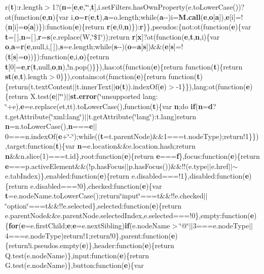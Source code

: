 {r}({\bf t})\-:r.\-length$>$1?({\bf n}=\mbox{[}{\bf e},{\bf e},\char`\"{}\char`\"{},{\bf t}\mbox{]},i.\-set\-Filters.\-has\-Own\-Property(e.\-to\-Lower\-Case())?ot(function({\bf e},{\bf n})\{var i,{\bf o}={\bf r}({\bf e},{\bf t}),{\bf a}=o.\-length;while({\bf a}-\/-\/)i={\bf M.\-call}({\bf e},{\bf o}\mbox{[}{\bf a}\mbox{]}),{\bf e}\mbox{[}i\mbox{]}=!({\bf n}\mbox{[}i\mbox{]}={\bf o}\mbox{[}{\bf a}\mbox{]})\})\-:function({\bf e})\{return {\bf r}({\bf e},0,{\bf n})\})\-:{\bf r}\}\},pseudos\-:\{not\-:ot(function({\bf e})\{var {\bf t}=\mbox{[}$\,$\mbox{]},{\bf n}=\mbox{[}$\,$\mbox{]},{\bf r}={\bf s}(e.\-replace(W,\char`\"{}\$1\char`\"{}));return {\bf r}\mbox{[}{\bf x}\mbox{]}?ot(function({\bf e},{\bf t},{\bf n},i)\{var {\bf o},{\bf a}={\bf r}({\bf e},null,i,\mbox{[}$\,$\mbox{]}),{\bf s}=e.\-length;while({\bf s}-\/-\/)({\bf o}={\bf a}\mbox{[}{\bf s}\mbox{]})\&\&({\bf e}\mbox{[}{\bf s}\mbox{]}=!({\bf t}\mbox{[}{\bf s}\mbox{]}={\bf o}))\})\-:function({\bf e},i,{\bf o})\{return {\bf t}\mbox{[}0\mbox{]}={\bf e},{\bf r}({\bf t},null,{\bf o},{\bf n}),!n.\-pop()\}\}),has\-:ot(function({\bf e})\{return function({\bf t})\{return {\bf st}({\bf e},{\bf t}).length$>$0\}\}),contains\-:ot(function({\bf e})\{return function({\bf t})\{return(t.\-text\-Content$\vert$$\vert$t.\-inner\-Text$\vert$$\vert${\bf o}({\bf t})).index\-Of({\bf e})$>$-\/1\}\}),lang\-:ot(function({\bf e})\{return X.\-test({\bf e}$\vert$$\vert$\char`\"{}\char`\"{})$\vert$$\vert${\bf st.\-error}(\char`\"{}unsupported lang\-: \char`\"{}+e),{\bf e}=e.\-replace(et,tt).to\-Lower\-Case(),function({\bf t})\{var {\bf n};do {\bf if}({\bf n}={\bf d}?t.\-get\-Attribute(\char`\"{}xml\-:lang\char`\"{})$\vert$$\vert$t.\-get\-Attribute(\char`\"{}lang\char`\"{})\-:t.\-lang)return {\bf n}=n.\-to\-Lower\-Case(),{\bf n}==={\bf e}$\vert$$\vert$0===n.\-index\-Of({\bf e}+\char`\"{}-\/\char`\"{});while(({\bf t}=t.\-parent\-Node)\&\&1===t.\-node\-Type);return!1\}\}),target\-:function({\bf t})\{var {\bf n}=e.\-location\&\&e.\-location.\-hash;return {\bf n}\&\&n.\-slice(1)===t.\-id\},root\-:function({\bf e})\{return {\bf e}==={\bf f}\},focus\-:function({\bf e})\{return {\bf e}===p.\-active\-Element\&\&(!p.\-has\-Focus$\vert$$\vert$p.\-has\-Focus())\&\&!!(e.\-type$\vert$$\vert$e.\-href$\vert$$\vert$$\sim$e.\-tab\-Index)\},enabled\-:function({\bf e})\{return e.\-disabled===!1\},disabled\-:function({\bf e})\{return e.\-disabled===!0\},checked\-:function({\bf e})\{var {\bf t}=e.\-node\-Name.\-to\-Lower\-Case();return\char`\"{}input\char`\"{}===t\&\&!!e.\-checked$\vert$$\vert$\char`\"{}option\char`\"{}===t\&\&!!e.\-selected\},selected\-:function({\bf e})\{return e.\-parent\-Node\&\&e.\-parent\-Node.\-selected\-Index,e.\-selected===!0\},empty\-:function({\bf e})\{{\bf for}({\bf e}=e.\-first\-Child;{\bf e};{\bf e}=e.\-next\-Sibling){\bf if}(e.\-node\-Name$>$\char`\"{}@\char`\"{}$\vert$$\vert$3===e.\-node\-Type$\vert$$\vert$4===e.\-node\-Type)return!1;return!0\},parent\-:function({\bf e})\{return!i.\-pseudos.\-empty({\bf e})\},header\-:function({\bf e})\{return Q.\-test(e.\-node\-Name)\},input\-:function({\bf e})\{return G.\-test(e.\-node\-Name)\},button\-:function({\bf e})\{var {\bf }
